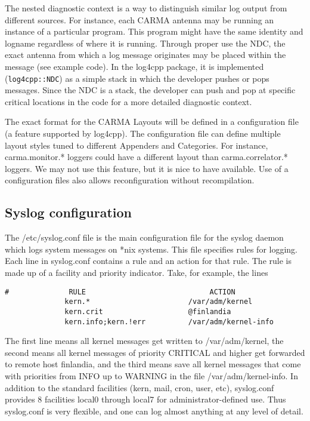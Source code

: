 \documentclass[preprint]{aastex}
\begin{document}
The nested diagnostic context is a way to distinguish similar log
output from different sources. For instance, each CARMA antenna
may be running an instance of a particular program.  This program
might have the same identity and logname regardless of where it
is running. Through proper use the NDC, the exact antenna from
which a log message originates may be placed within the message
(see example code).  In the log4cpp package, it is implemented
({\tt log4cpp::NDC}) as a simple stack in which the developer
pushes or pops messages.  Since the NDC is a stack, the developer
can push and pop at specific critical locations in the code for a
more detailed diagnostic context.

The exact format for the CARMA Layouts will be defined in a configuration file
(a feature supported by log4cpp).  The configuration file can define
multiple layout styles tuned to different Appenders and Categories.
For instance, carma.monitor.* loggers could have a different layout
than carma.correlator.* loggers.  We may not use this feature,
but it is nice to have available.  Use of a configuration files
also allows reconfiguration without recompilation.


\subsection{Syslog configuration}

The  /etc/syslog.conf  file is the  main configuration file for the 
syslog daemon which logs system messages on *nix systems.  
This file specifies rules for logging.  Each line in syslog.conf
contains a rule and an action for that rule.  The rule is
made up of a facility and priority indicator. Take, for example, the
lines

\begin{verbatim}
#              RULE                             ACTION
              kern.*                       /var/adm/kernel
              kern.crit                    @finlandia
              kern.info;kern.!err          /var/adm/kernel-info
\end{verbatim}


The first line means all kernel messages get written to
/var/adm/kernel, the second means all kernel messages of priority
CRITICAL and higher get forwarded to remote host finlandia, and the
third means save all kernel messages that come  with  priorities
from  INFO  up  to  WARNING   in   the   file /var/adm/kernel-info.
In addition to the standard facilities (kern, mail, cron, user,
etc), syslog.conf provides 8 facilities local0 through local7
for administrator-defined use. Thus syslog.conf is very flexible,
and one can log almost anything at any level of detail.  
\end{document}

